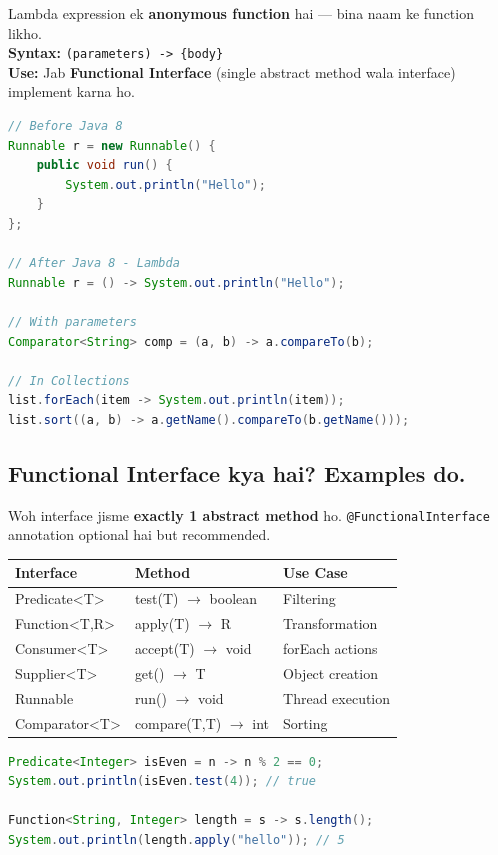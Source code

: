 \documentclass[12pt,a4paper]{article}
\begin{document}
\begin{answerbox}
Lambda expression ek \textbf{anonymous function} hai --- bina naam ke function likho.\\[5pt]
\textbf{Syntax:} \texttt{(parameters) -> \{body\}}\\[5pt]
\textbf{Use:} Jab \textbf{Functional Interface} (single abstract method wala interface) implement karna ho.
\begin{lstlisting}[language=Java]
// Before Java 8
Runnable r = new Runnable() {
    public void run() {
        System.out.println("Hello");
    }
};

// After Java 8 - Lambda
Runnable r = () -> System.out.println("Hello");

// With parameters
Comparator<String> comp = (a, b) -> a.compareTo(b);

// In Collections
list.forEach(item -> System.out.println(item));
list.sort((a, b) -> a.getName().compareTo(b.getName()));
\end{lstlisting}
\end{answerbox}

\subsection{Functional Interface kya hai? Examples do.}

\begin{answerbox}
Woh interface jisme \textbf{exactly 1 abstract method} ho. \texttt{@FunctionalInterface} annotation optional hai but recommended.
\begin{center}
\begin{tabular}{>{\ttfamily}l l l}
\toprule
\textbf{Interface} & \textbf{Method} & \textbf{Use Case} \\
\midrule
Predicate<T> & test(T) $\rightarrow$ boolean & Filtering \\
Function<T,R> & apply(T) $\rightarrow$ R & Transformation \\
Consumer<T> & accept(T) $\rightarrow$ void & forEach actions \\
Supplier<T> & get() $\rightarrow$ T & Object creation \\
Runnable & run() $\rightarrow$ void & Thread execution \\
Comparator<T> & compare(T,T) $\rightarrow$ int & Sorting \\
\bottomrule
\end{tabular}
\end{center}
\begin{lstlisting}[language=Java]
Predicate<Integer> isEven = n -> n % 2 == 0;
System.out.println(isEven.test(4)); // true

Function<String, Integer> length = s -> s.length();
System.out.println(length.apply("hello")); // 5
\end{lstlisting}
\end{answerbox}
\end{document}
